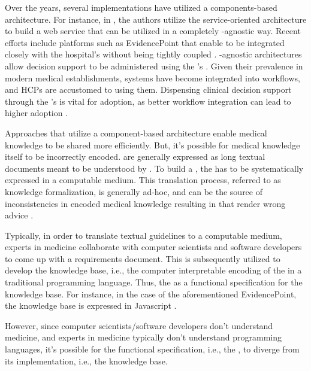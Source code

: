 Over the years, several \CDSS{} implementations have utilized a
components-based architecture. For instance, in \cite{KawamotoJBI10}, the
authors utilize the service-oriented architecture \cite{ErlBook05} to build
a \CDSS{} web service that can be utilized in a completely \EHR{}-agnostic way.
Recent efforts include \CDSSs{} platforms such as
EvidencePoint that enable \CDSS{} to be integrated
closely with the hospital's \EHR{} without being tightly coupled \cite{SolomonJMIR23}.
\EHR{}-agnostic architectures allow decision support to be administered using the
\EHR{}'s \UI{}. Given their prevalence in modern medical establishments,
\EHR{} systems have become integrated into workflows,
and HCPs are accustomed to using them. Dispensing clinical decision
support through the \EHR{}'s \UI{} is vital for adoption, as better workflow
integration can lead to higher adoption \cite{PressJMIR16,LiJMI16}.

Approaches that utilize a component-based architecture
enable medical knowledge to be shared more efficiently.
But, it's possible for medical knowledge itself to be incorrectly
encoded. \BPGs{} are generally expressed as long textual documents meant to
be understood by \HCPs{} \cite{SchiffmanYMI13}. To build a \CDSS{}, the \BPG{} has to be
systematically expressed in a computable medium. This translation process,
referred to as knowledge formalization, is generally ad-hoc, and can be
the source of inconsistencies in encoded medical knowledge
resulting in \CDSSs{} that render wrong advice \cite{ShaharIOS04}.

Typically, in order to translate textual guidelines to a computable
medium, experts in medicine collaborate with computer scientists and
software developers to come up with a requirements document.
This is subsequently utilized to develop the knowledge base, i.e.,
the computer interpretable encoding of the \BPG{} \cite{PelegJBI13} in a
traditional programming language. Thus, the \BPG{} as a
functional specification for the knowledge base.
For instance, in the case of the aforementioned EvidencePoint,
the knowledge base is expressed in  Javascript \cite{SolomonJMIR23}.

However, since computer scientists/software
developers don't understand medicine, and experts in medicine typically
don't understand programming languages,
it's possible for the functional specification, i.e., the \BPG{}, to
diverge from its implementation, i.e., the knowledge base.






